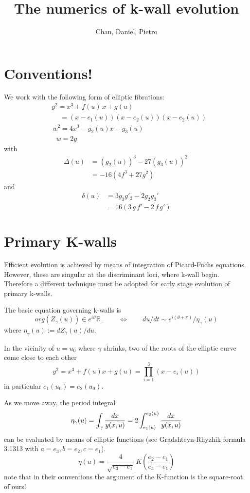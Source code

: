 \documentclass[11pt]{article}
\title{	The numerics of k-wall evolution}
\author{Chan, Daniel, Pietro}
\newcommand{\be}{\begin{equation}}
\newcommand{\ee}{\end{equation}}
\newcommand{\IR}{\mathbb{R}}
\begin{document}
\maketitle
\tableofcontents



\section{Conventions!}
We work with the following form of elliptic fibrations:
\be
\begin{split}
	& \boxed{y^{2} = x^{3} + f(u)\, x +g(u)} \\
	& \phantom{y^{2}}\,\, = (x-e_{1}(u))  (x-e_{2}(u))  (x-e_{2}(u)) \\
	& \, w^{2} = 4x^{3} - g_{2}(u) x - g_{3}(u) \\
	& \, \,\,\, w = 2 y
\end{split}
\ee
with
\be
\begin{split}
 	\Delta(u) & = (g_{2}(u))^{3} - 27 (g_{3}(u))^{2}\ \\
	& = \boxed{ -16 (4 f^{3} + 27 g^{2})}
\end{split}
\ee
and 
\be
\begin{split}
 	\delta(u) & = 3g_{3} g'_{2} - 2 g_{2} g_{3}' \\
	& = \boxed{ 16 (3\,g \,f' - 2 \,f\, g ')}
\end{split}
\ee


\section{Primary K-walls}
Efficient evolution is achieved by means of integration of Picard-Fuchs equations.
However, these are singular at the discriminant loci, where k-wall begin. Therefore a different technique must be adopted for early stage evolution of primary k-walls.

The basic equation governing k-walls is
\be
	arg(Z_{\gamma}(u)) \in e^{i\vartheta}\IR_{-} \qquad \Leftrightarrow \qquad du/dt \sim e^{i(\theta +\pi)} / \eta_{\gamma}(u)
\ee
where $\eta_{\gamma}(u):=dZ_{\gamma}(u) / du$.

In the vicinity of $u=u_{0}$ where $\gamma$ shrinks, two of the roots of the elliptic curve come close to each other
\be
	y^{2} = x^{3} + f(u) x +g(u) = \prod_{i=1}^{3}(x-e_{i}(u))
\ee
in particular $e_{1}(u_{0})= e_{2}(u_{0})$.

As we move away, the period integral
\be
	\eta_{\gamma}(u) = \int_{\gamma} {dx\over y(x,u)} = 2 \int_{e_{1}(u)}^{e_{2}(u)}{dx\over y(x,u)}
\ee
can be evaluated by means of elliptic functions (see Gradshteyn-Rhyzhik formula 3.1313 with $a=e_{3}, b=e_{2}, c=e_{1}$).
\be
	\eta(u) = \frac{4}{\sqrt{e_{3}-e_{1}}} \, K\left( \frac{e_{2}-e_{1}}{e_{3}-e_{1}} \right)
\ee
note that in their conventions the argument of the K-function is the square-root of ours!
\end{document}
